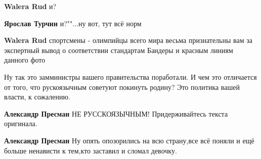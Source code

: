 \begin{itemize}
\begin{itemize}
\textbf{Walera Rud} и?

 
\textbf{Ярослав Турчин} и?""...ну вот, тут всё норм

 
\textbf{Walera Rud} спортсмены - олимпийцы всего мира весьма признательны вам
за экспертный вывод о соответствии стандартам Бандеры и красным линиям данного
фото \Smiley[1.0][yellow]
\end{itemize}

 

Ну так это замминистры вашего правительства поработали. И чем это отличается от
того, что рускоязычным советуют покинуть родину? Это политика вашей власти, к
сожалению.

\begin{itemize}
 
\textbf{Александр Пресман} НЕ РУССКОЯЗЫЧНЫМ! Придерживайтесь текста оригинала.

 
\textbf{Александр Пресман} Ну опять опозорились на всю страну,все всё поняли и ещё больше ненависти к тем,кто заставил и сломал девочку.
\end{itemize}

 

\end{itemize}
